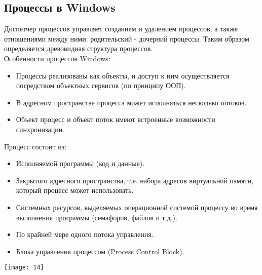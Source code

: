 \documentclass[a4paper]{article}
\begin{document}
\subsection{Процессы в Windows}
Диспетчер процессов управляет созданием и удалением процессов, а также отношениями между ними: родительский - дочерний процессы. Таким образом определяется древовидная структура процессов.\\
Особенности процессов Windows:
\begin{itemize}
        \item Процессы реализованы как объекты, и доступ к ним осуществляется посредством объектных сервисов (по принципу ООП).
	\item В адресном пространстве процесса может исполняться несколько потоков.
	\item Объект процесс и объект поток имеют встроенные возможности синхронизации.
\end{itemize}
Процесс состоит из:
\begin{itemize}
        \item Исполняемой программы (код и данные).
	\item Закрытого адресного пространства, т.е. набора адресов виртуальной памяти, который процесс может использовать.
	\item Системных ресурсов, выделяемых операционной системой процессу во время выполнения программы (семафоров, файлов и т.д.).
	\item По крайней мере одного потока управления.
	\item Блока управления процессом (Process Control Block).
\end{itemize}
\begin{center}
	\texttt{[image: 14]}
\end{center}
\end{document}
